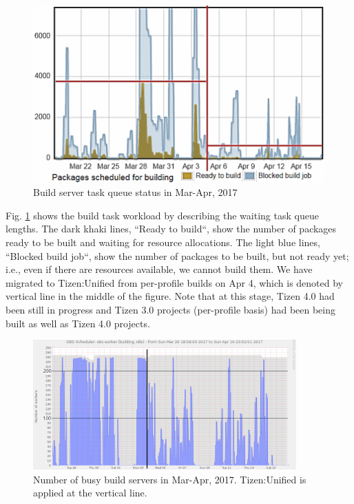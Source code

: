 \begin{figure}
\centering
\includegraphics[width=0.95\columnwidth]{figures/tizen_build_obs_buildqueue_4wks_colored.png}
\caption{Build server task queue status in Mar-Apr, 2017}
\label{FIG_OBS_TASKQUEUE}
\end{figure}

Fig. \ref{FIG_OBS_TASKQUEUE} shows the build task workload by describing the waiting task queue lengths.
The dark khaki lines, ``Ready to build``, show the number of packages ready to be built and waiting for resource allocations.
The light blue lines, ``Blocked build job``, show the number of packages to be built, but not ready yet; i.e., even if there are resources available, we cannot build them.
We have migrated to Tizen:Unified from per-profile builds on Apr 4, which is denoted by vertical line in the middle of the figure.
Note that at this stage, Tizen 4.0 had been still in progress and Tizen 3.0 projects (per-profile basis) had been being built as well as Tizen 4.0 projects.


\begin{figure}
\centering
\includegraphics[width=0.90\textwidth,height=5cm]{figures/tizen_build_obs_munin.png}
\caption{Number of busy build servers in Mar-Apr, 2017. Tizen:Unified is applied at the vertical line.}
\label{FIG_OBS_MUNIN}
\end{figure}

